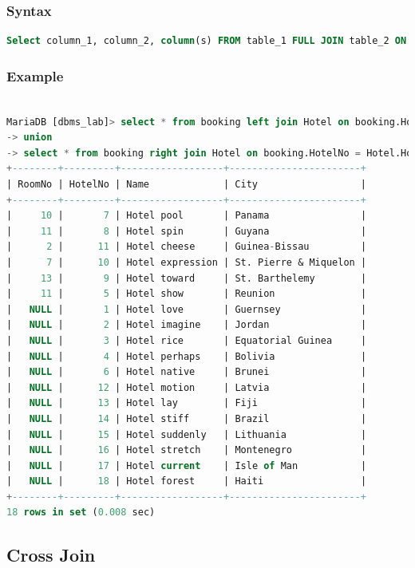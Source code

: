 \documentclass[11pt]{article}
\begin{document}
\subsubsection*{Syntax}

\begin{lstlisting}[language=sql]
	Select column_1, column_2, column(s) FROM table_1 FULL JOIN table_2 ON table_1.column_name = table_2.column_name;  
\end{lstlisting}

\subsubsection*{Example}

\begin{lstlisting}[language=sql]

MariaDB [dbms_lab]> select * from booking left join Hotel on booking.HotelNo = Hotel.HotelNo
-> union
-> select * from booking right join Hotel on booking.HotelNo = Hotel.HotelNo;
+--------+---------+------------------+-----------------------+
| RoomNo | HotelNo | Name             | City                  |
+--------+---------+------------------+-----------------------+
|     10 |       7 | Hotel pool       | Panama                |
|     11 |       8 | Hotel spin       | Guyana                |
|      2 |      11 | Hotel cheese     | Guinea-Bissau         |
|      7 |      10 | Hotel expression | St. Pierre & Miquelon |
|     13 |       9 | Hotel toward     | St. Barthelemy        |
|     11 |       5 | Hotel show       | Reunion               |
|   NULL |       1 | Hotel love       | Guernsey              |
|   NULL |       2 | Hotel imagine    | Jordan                |
|   NULL |       3 | Hotel rice       | Equatorial Guinea     |
|   NULL |       4 | Hotel perhaps    | Bolivia               |
|   NULL |       6 | Hotel native     | Brunei                |
|   NULL |      12 | Hotel motion     | Latvia                |
|   NULL |      13 | Hotel lay        | Fiji                  |
|   NULL |      14 | Hotel stiff      | Brazil                |
|   NULL |      15 | Hotel suddenly   | Lithuania             |
|   NULL |      16 | Hotel stretch    | Montenegro            |
|   NULL |      17 | Hotel current    | Isle of Man           |
|   NULL |      18 | Hotel forest     | Haiti                 |
+--------+---------+------------------+-----------------------+
18 rows in set (0.008 sec)
\end{lstlisting}

\subsection{Cross Join}
\end{document}

